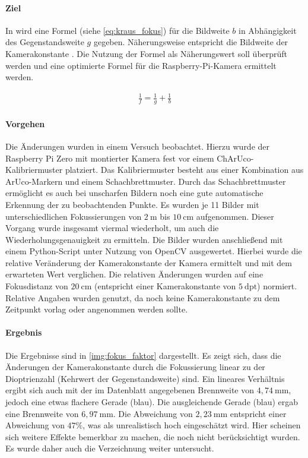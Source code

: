 \documentclass[./00PhotoBox.tex]{subfiles}
\begin{document}
\paragraph{Ziel}
In \citet[S. 59]{kraus} wird eine Formel (siehe \autoref{eq:kraus_fokus}) für die \Gls{Bildweite} $b$ in Abhängigkeit des Gegenstandsweite $g$ gegeben. Näherungsweise entspricht die Bildweite der Kamerakonstante \citep[S. 59]{kraus}. Die Nutzung der Formel als Näherungswert soll überprüft werden und eine optimierte Formel für die Raspberry-Pi-Kamera ermittelt werden.

\begin{align}
    \frac{1}{f} = \frac{1}{g} + \frac{1}{b}
    \label{eq:kraus_fokus}
\end{align}

\paragraph{Vorgehen}
Die Änderungen wurden in einem Versuch beobachtet. Hierzu wurde der Raspberry Pi Zero mit montierter Kamera fest vor einem ChArUco-Kalibriermuster platziert. Das Kalibriermuster besteht aus einer Kombination aus ArUco-Markern und einem Schachbrettmuster.  Durch das Schachbrettmuster ermöglicht es auch bei unscharfen Bildern noch eine gute automatische Erkennung der zu beobachtenden Punkte. Es wurden je 11 Bilder mit unterschiedlichen Fokussierungen von $2~\text{m}$ bis  $10~\text{cm}$ aufgenommen. Dieser Vorgang wurde insgesamt viermal wiederholt, um auch die Wiederholungsgenauigkeit zu ermitteln. Die Bilder wurden anschließend mit einem Python-Script unter Nutzung von OpenCV ausgewertet. Hierbei wurde die relative Veränderung der Kamerakonstante der Kamera ermittelt und mit dem erwarteten Wert verglichen. Die relativen Änderungen wurden auf eine Fokusdistanz von $20~\text{cm}$ (entspricht einer Kamerakonstante von $5~\text{dpt}$) normiert. Relative Angaben wurden genutzt, da noch keine Kamerakonstante zu dem Zeitpunkt vorlag oder angenommen werden sollte.

\paragraph{Ergebnis}
Die Ergebnisse sind in \autoref{img:fokus_faktor} dargestellt. Es zeigt sich, dass die Änderungen der Kamerakonstante durch die Fokussierung linear zu der Dioptrienzahl (Kehrwert der Gegenstandsweite) sind. Ein lineares Verhältnis ergibt sich auch mit der im Datenblatt angegebenen Brennweite von $4,74~\text{mm}$, jedoch eine etwas flachere Gerade (blau). Die ausgleichende Gerade (blau) ergab eine Brennweite von $6,97~\text{mm}$. Die Abweichung von $2,23~\text{mm}$ entspricht einer Abweichung von $47\%$, was als unrealistisch hoch eingeschätzt wird. Hier scheinen sich weitere Effekte bemerkbar zu machen, die noch nicht berücksichtigt wurden. Es wurde daher auch die Verzeichnung weiter untersucht.
\end{document}
